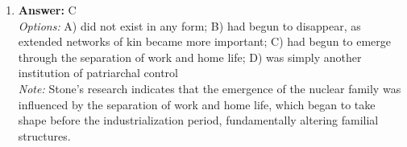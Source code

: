 \documentclass[12pt]{article}
\begin{document}
\begin{enumerate}[label=\arabic*.]
\\ \textit{Note:} The correct answer is based on the concept of political socialization, which posits that individuals are influenced by the values, beliefs, and norms of their family and community, leading working-class individuals to align with the Labour Party, historically associated with their socio-economic interests.
\item \textbf{Answer:} C
\\ \textit{Options:} A) did not exist in any form; B) had begun to disappear, as extended networks of kin became more important; C) had begun to emerge through the separation of work and home life; D) was simply another institution of patriarchal control
\\ \textit{Note:} Stone's research indicates that the emergence of the nuclear family was influenced by the separation of work and home life, which began to take shape before the industrialization period, fundamentally altering familial structures.
\end{enumerate}
\end{document}
